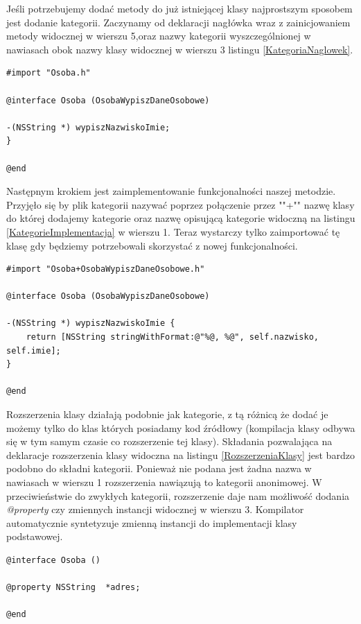 \documentclass{iiuwb}
\begin{document}
Jeśli potrzebujemy dodać metody do już istniejącej klasy najprostszym sposobem jest dodanie kategorii. Zaczynamy od deklaracji nagłówka wraz z zainicjowaniem metody widocznej w wierszu 5,oraz nazwy kategorii wyszczególnionej w nawiasach obok nazwy klasy widocznej w wierszu 3 listingu \ref{KategoriaNaglowek}.
\begin{lstlisting}[label=KategoriaNaglowek, caption=Deklaracja nowej metody poprzez kategorie]
#import "Osoba.h"

@interface Osoba (OsobaWypiszDaneOsobowe)

-(NSString *) wypiszNazwiskoImie;
}

@end
\end{lstlisting}
Następnym krokiem jest zaimplementowanie funkcjonalności naszej metodzie. Przyjęło się by plik kategorii nazywać poprzez połączenie przez ""+""  nazwę klasy do której dodajemy kategorie oraz nazwę opisującą kategorie widoczną na listingu \ref{KategorieImplementacja} w wierszu 1. Teraz wystarczy tylko zaimportować tę klasę gdy będziemy potrzebowali skorzystać z nowej funkcjonalności.
\begin{lstlisting}[label=KategorieImplementacja, caption=Definicja metody kategorii]
#import "Osoba+OsobaWypiszDaneOsobowe.h"

@interface Osoba (OsobaWypiszDaneOsobowe)

-(NSString *) wypiszNazwiskoImie {
	return [NSString stringWithFormat:@"%@, %@", self.nazwisko, self.imie];
}

@end
\end{lstlisting}
Rozszerzenia klasy działają podobnie jak kategorie, z tą różnicą że dodać je możemy tylko do klas których posiadamy kod źródłowy (kompilacja klasy odbywa się w tym samym czasie co rozszerzenie tej klasy). Składania pozwalająca na deklaracje rozszerzenia klasy widoczna na listingu \ref{RozszerzeniaKlasy} jest bardzo podobno do składni kategorii. Ponieważ nie podana jest żadna nazwa w nawiasach w wierszu 1 rozszerzenia nawiązują to kategorii anonimowej. W przeciwieństwie do zwykłych kategorii, rozszerzenie daje nam możliwość dodania \textit{@property} czy zmiennych instancji widocznej w wierszu 3. Kompilator automatycznie syntetyzuje zmienną instancji do implementacji klasy podstawowej.

\begin{lstlisting}[label=RozszerzeniaKlasy, caption=Deklaracja nowego parametru poprzez rozszerzenie klasy bazowej]
@interface Osoba ()

@property NSString  *adres; 

@end
\end{lstlisting}
\end{document}
